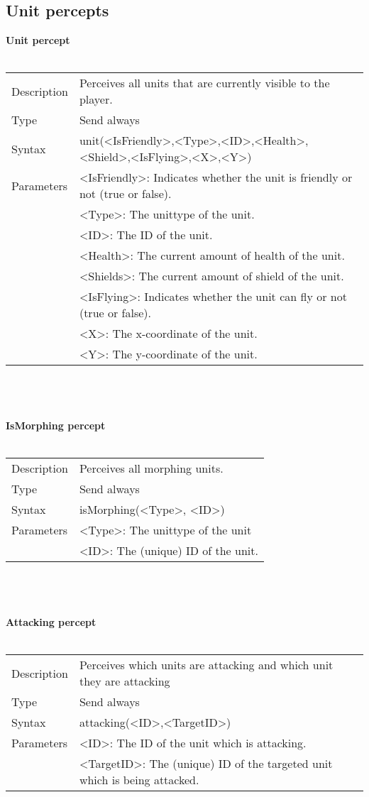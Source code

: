\documentclass[english,11pt]{report}
\begin{document}
\subsection{Unit percepts}
\textbf{Unit percept}\\
\\
\begin{tabularx}{\textwidth}{lX}
 Description & Perceives all units that are currently visible to the player. \\
 Type & Send always \\
 Syntax & unit(<IsFriendly>,<Type>,<ID>,<Health>,<Shield>,<IsFlying>,<X>,<Y>) \\
 Parameters &   <IsFriendly>: Indicates whether the unit is friendly or not (true or false).\\
            &   <Type>: The unittype of the unit. \\
            &   <ID>: The ID of the unit.\\
            &   <Health>: The current amount of health of the unit.\\
            &   <Shields>: The current amount of shield of the unit.\\
            &   <IsFlying>: Indicates whether the unit can fly or not (true or false).\\
            &   <X>: The x-coordinate of the unit.\\
            &   <Y>: The y-coordinate of the unit.
\end{tabularx}\\
\\
\\
\newpage
\noindent
\textbf{IsMorphing percept}\\
\\
\begin{tabularx}{\textwidth}{lX}
 Description & Perceives all morphing units. \\
 Type & Send always \\
 Syntax & isMorphing(<Type>, <ID>) \\
 Parameters &   <Type>: The unittype of the unit\\
            &     <ID>: The (unique) ID of the unit.\\
\end{tabularx}\\
\\
\\
\textbf{Attacking percept}\\
\\
\begin{tabularx}{\textwidth}{lX}
 Description & Perceives which units are attacking and which unit they are attacking \\
 Type & Send always \\
 Syntax & attacking(<ID>,<TargetID>) \\
 Parameters &   <ID>: The ID of the unit which is attacking.\\
            &   <TargetID>: The (unique) ID of the targeted unit which is being attacked.
\end{tabularx} \\
\end{document}
